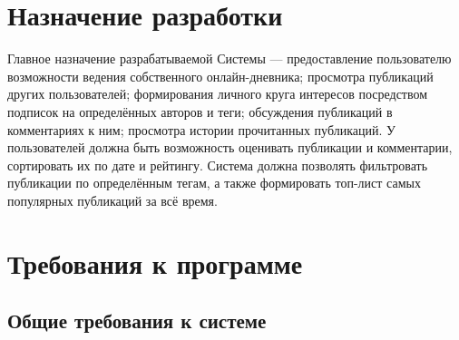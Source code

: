 \documentclass{bmstu-gost-7-32}
\begin{document}
\section{Назначение разработки}



Главное назначение разрабатываемой Системы — предоставление пользователю возможности ведения собственного онлайн-дневника; просмотра публикаций других пользователей; формирования личного круга интересов посредством подписок на определённых авторов и теги; обсуждения публикаций в комментариях к ним; просмотра истории прочитанных публикаций.
У пользователей должна быть возможность оценивать публикации и комментарии, сортировать их по дате и рейтингу.
Система должна позволять фильтровать публикации по определённым тегам, а также формировать топ-лист самых популярных публикаций за всё время.

\section{Требования к программе} %

\subsection{Общие требования к системе}

\end{document}
